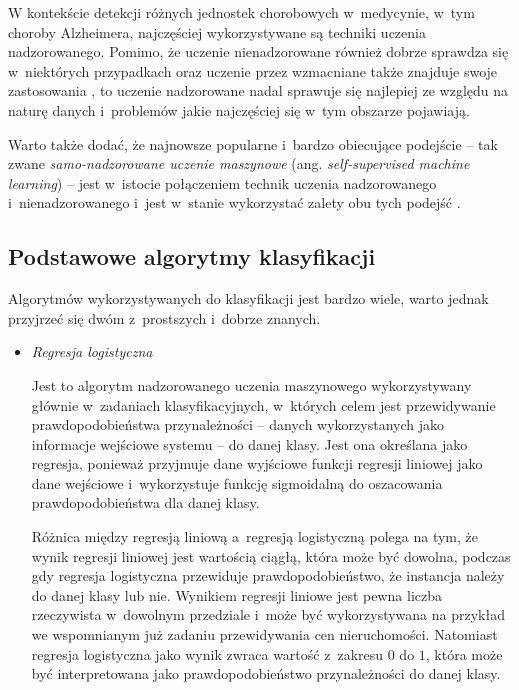 {W kontekście detekcji różnych jednostek chorobowych w~medycynie, w~tym choroby Alzheimera, najczęściej wykorzystywane są techniki uczenia nadzorowanego.
Pomimo, że uczenie nienadzorowane również dobrze sprawdza się w~niektórych przypadkach \cite{raza2021tour} oraz uczenie przez wzmacniane także znajduje swoje zastosowania \cite{zhou2021deep}, to uczenie nadzorowane nadal sprawuje się najlepiej ze względu na naturę danych i~problemów jakie najczęściej się w~tym obszarze pojawiają.

Warto także dodać, że najnowsze popularne i~bardzo obiecujące podejście -- tak zwane \emph{samo-nadzorowane uczenie maszynowe} (ang. \emph{self-supervised machine learning}) -- jest w~istocie połączeniem technik uczenia nadzorowanego i~nienadzorowanego i~jest w~stanie wykorzystać zalety obu tych podejść \cite{krishnan2022self}.

\subsection{Podstawowe algorytmy klasyfikacji}

Algorytmów wykorzystywanych do klasyfikacji jest bardzo wiele, warto jednak przyjrzeć się dwóm z~prostszych i~dobrze znanych.

\begin{itemize}

  \item \emph{Regresja logistyczna}

        Jest to algorytm nadzorowanego uczenia maszynowego wykorzystywany głównie w~zadaniach klasyfikacyjnych, w~których celem jest przewidywanie prawdopodobieństwa przynależności  -- danych wykorzystanych jako informacje wejściowe systemu -- do danej klasy.
        Jest ona określana jako regresja, ponieważ przyjmuje dane wyjściowe funkcji regresji liniowej jako dane wejściowe i~wykorzystuje funkcję sigmoidalną do oszacowania prawdopodobieństwa dla danej klasy.

        Różnica między regresją liniową a~regresją logistyczną polega na tym, że wynik regresji liniowej jest wartością ciągłą, która może być dowolna, podczas gdy regresja logistyczna przewiduje prawdopodobieństwo, że instancja należy do danej klasy lub nie.
        Wynikiem regresji liniowe jest pewna liczba rzeczywista w~dowolnym przedziale i~może być wykorzystywana na przykład we wspomnianym już zadaniu przewidywania cen nieruchomości.
        Natomiast regresja logistyczna jako wynik zwraca wartość z~zakresu $0$ do $1$, która może być interpretowana jako prawdopodobieństwo przynależności do danej klasy.


\end{itemize}}
